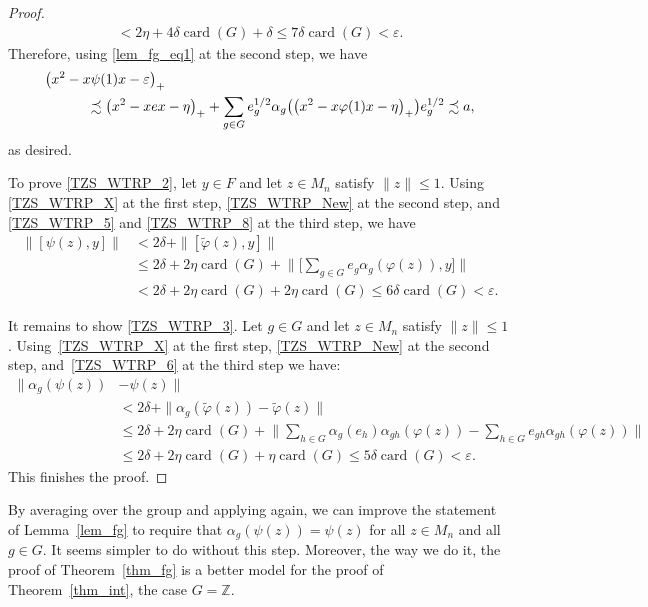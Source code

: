 \documentclass[11pt]{amsart}
\theoremstyle{plain}
\theoremstyle{definition}
\theoremstyle{remark}
\numberwithin{equation}{section}
\newcommand{\card}{{\operatorname{card}}}
\begin{document}
\begin{proof}
\begin{align*}
  < 2 \eta + 4 \delta  \card (G) + \delta
  \leq 7 \delta  \card (G)
  < \varepsilon.
\end{align*}
%
Therefore, using \eqref{lem_fg_eq1} at the second step, we have
%
\begin{align*}
& \big( x^{2} - x \psi (1) x - \varepsilon \big)_{+}
\\
& \hspace*{3em} {\mbox{}}
\precsim \big( x^{2} - x e x - \eta \big)_{+}
  + \sum_{g \in G} e_{g}^{1/2}
     \alpha_{g} \big( \big( x^{2}
        - x \varphi (1) x - \eta \big)_{+} \big) e_{g}^{1/2}
 \precsim a,
\end{align*}
%
as desired.

To prove \ref{TZS_WTRP_2}, let $y \in F$
and let $z \in M_{n}$ satisfy $\| z \| \leq 1$.
Using \eqref{TZS_WTRP_X} at the first step,
\eqref{TZS_WTRP_New} at the second step,
and \eqref{TZS_WTRP_5} and \eqref{TZS_WTRP_8} at the third step,
we have
%
\begin{align*}
\|[\psi (z), y] \|
& < 2 \delta + \|[\widetilde{\varphi} (z), y] \|
\\
& \leq  2 \delta + 2 \eta \card (G)
  + \Bigg\| \Bigg[
     \sum_{g \in G} e_{g} \alpha_{g} (\varphi (z)), y \Bigg] \Bigg\|
\\
& < 2 \delta + 2 \eta  \card (G)+ 2 \eta  \card (G)
  \leq 6 \delta \card (G)
  < \varepsilon.
\end{align*}
%

It remains to show \ref{TZS_WTRP_3}.
Let $g \in G$ and let $z \in M_{n}$ satisfy $\| z \| \leq 1$.
Using~\eqref{TZS_WTRP_X} at the first step,
\eqref{TZS_WTRP_New} at the second step,
and~\eqref{TZS_WTRP_6} at the third step we have:
%
\begin{align*}
\| \alpha_{g} (\psi (z))
& - \psi (z) \|
\\
& < 2 \delta + \| \alpha_{g} (\widetilde{\varphi} (z))
  - \widetilde{\varphi} (z) \|
\\
& \leq 2 \delta +2 \eta   \card (G) +
\Bigg\| \sum_{h \in G} \alpha_{g} (e_{h}) \alpha_{gh} (\varphi (z)) -
\sum_{h \in G} e_{gh} \alpha_{gh} (\varphi (z)) \Bigg\|
\\
& \leq 2 \delta + 2 \eta \card (G) + \eta \card (G)
  \leq 5 \delta  \card (G)
  < \varepsilon.
\end{align*}
%
This finishes the proof.
\end{proof}

By averaging over the group
and applying \cite[Proposition 2.5]{KW04} again,
we can improve the statement of Lemma~\ref{lem_fg}
to require that $\alpha_g (\psi (z)) = \psi (z)$
for all $z \in M_n$ and all $g \in G$.
It seems simpler to do without this step.
Moreover, the way we do it,
the proof of Theorem~\ref{thm_fg} is a better model for
the proof of Theorem~\ref{thm_int}, the case $G = \mathbb{Z}$.
\end{document}
